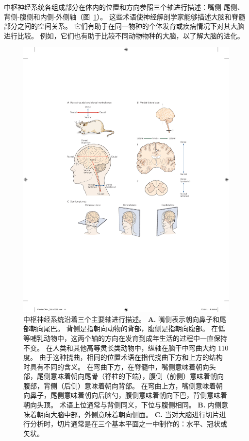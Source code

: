 \begin{proposition}[神经解剖学导航术语] \label{box:1_1}
	
	\quad \quad 中枢神经系统各组成部分在体内的位置和方向参照三个轴进行描述：嘴侧-尾侧、背侧-腹侧和内侧-外侧轴（图~\ref{fig:1_2}）。
	这些术语使神经解剖学家能够描述大脑和脊髓部分之间的空间关系。
	它们有助于在同一物种的个体发育或疾病情况下对其大脑进行比较。
	例如，它们也有助于比较不同动物物种的大脑，以了解大脑的进化。

\end{proposition}


\begin{figure}[htbp]
	\centering
	\includegraphics[width=0.85\linewidth]{chap01/fig_1_2}
	\caption{中枢神经系统沿着三个主要轴进行描述\cite{martin2012neuroanatomy}。 
		\textbf{A.} 嘴侧表示朝向鼻子和尾部朝向尾巴。
		背侧是指朝向动物的背部，腹侧是指朝向腹部。
		在低等哺乳动物中，这两个轴的方向在发育到成年生活的过程中一直保持不变。
		在人类和其他高等灵长类动物中，纵轴在脑干中弯曲大约 110 度。
		由于这种挠曲，相同的位置术语在指代挠曲下方和上方的结构时具有不同的含义。
		在弯曲下方，在脊髓中，嘴侧意味着朝向头部，尾侧意味着朝向尾骨（脊柱的下端），腹侧（前侧）意味着朝向腹部，背侧（后侧）意味着朝向背部。
		在弯曲上方，嘴侧意味着朝向鼻子，尾侧意味着朝向后脑勺，腹侧意味着朝向下巴，背侧意味着朝向头顶。
		术语上位通常与背侧同义，下位与腹侧相同。
		\textbf{B.} 内侧意味着朝向大脑中部，外侧意味着朝向侧面。
		\textbf{C.} 当对大脑进行切片进行分析时，切片通常是在三个基本平面之一中制作的：水平、冠状或矢状。}
	\label{fig:1_2}
\end{figure}




